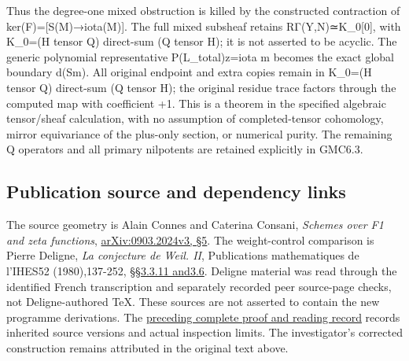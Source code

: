 Thus the degree-one mixed obstruction is killed by the constructed
contraction of ker(F)={[}S(M)→iota(M){]}. The full mixed subsheaf
retains RΓ(Y,N)≃K\_0{[}0{]}, with K\_0=(H tensor Q) direct-sum (Q tensor
H); it is not asserted to be acyclic. The generic polynomial
representative P(L\_total)z=iota m becomes the exact global boundary
d(Sm). All original endpoint and extra copies remain in K\_0=(H tensor
Q) direct-sum (Q tensor H); the original residue trace factors through
the computed map with coefficient +1. This is a theorem in the specified
algebraic tensor/sheaf calculation, with no assumption of
completed-tensor cohomology, mirror equivariance of the plus-only
section, or numerical purity. The remaining Q operators and all primary
nilpotents are retained explicitly in GMC6.3.

\subsection{Publication source and dependency
links}\label{publication-source-and-dependency-links}

The source geometry is Alain Connes and Caterina Consani, \emph{Schemes
over F1 and zeta functions},
\href{https://arxiv.org/abs/0903.2024v3}{arXiv:0903.2024v3, §5}. The
weight-control comparison is Pierre Deligne, \emph{La conjecture de
Weil. II}, Publications mathematiques de l'IHES52 (1980),137-252,
\href{https://www.numdam.org/item/PMIHES_1980__52__137_0/}{§§3.3.11
and3.6}. Deligne material was read through the identified French
transcription and separately recorded peer source-page checks, not
Deligne-authored TeX. These sources are not asserted to contain the new
programme derivations. The
\href{https://github.com/KokunoYumeto/zeta-function-research-reader/blob/36a82ecca98addb8a98b48204e349737856c7223/workbenches/splitzero-tandem/continuations/20260924-cohomology-weight-and-character-lifts/BUILD_AND_REVIEW.md}{preceding
complete proof and reading record} records inherited source versions and
actual inspection limits. The investigator's corrected construction
remains attributed in the original text above.
